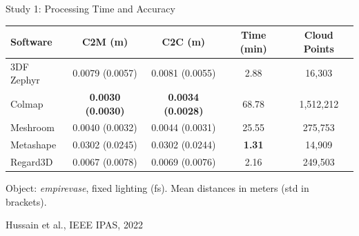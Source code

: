 \documentclass[aspectratio=169, 12pt]{beamer}
\newcommand{\citefooter}[1]{\hfill{\tiny #1}}
\begin{document}
\begin{frame}{Study 1: Processing Time and Accuracy}
	\begin{center}
	\begin{tabular}{l c c c c}
		\toprule
		\textbf{Software} & \textbf{C2M (m)} & \textbf{C2C (m)} & \textbf{Time (min)} & \textbf{Cloud Points} \\
		\midrule
		3DF Zephyr & 0.0079 (0.0057) & 0.0081 (0.0055) & 2.88  & 16{,}303   \\
		Colmap     & \textbf{0.0030 (0.0030)} & \textbf{0.0034 (0.0028)} & 68.78 & 1{,}512{,}212 \\
		Meshroom   & 0.0040 (0.0032) & 0.0044 (0.0031) & 25.55 & 275{,}753  \\
		Metashape  & 0.0302 (0.0245) & 0.0302 (0.0244) & \textbf{1.31}  & 14{,}909   \\
		Regard3D   & 0.0067 (0.0078) & 0.0069 (0.0076) & 2.16  & 249{,}503  \\
		\bottomrule
	\end{tabular}
	\end{center}
	
	\vspace{0.2cm}
	
	\small Object: \textit{empirevase}, fixed lighting (fs). Mean distances in meters (std in brackets).
		
	\citefooter{Hussain et al., IEEE IPAS, 2022}
\end{frame}
\end{document}
